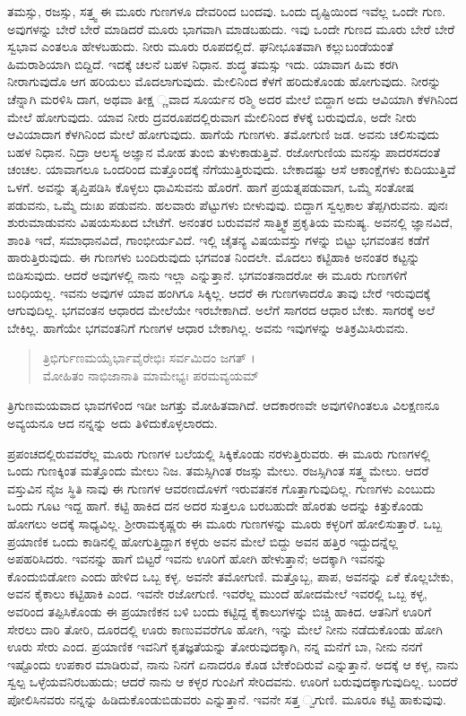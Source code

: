ತಮಸ್ಸು, ರಜಸ್ಸು, ಸತ್ತ್ವ ಈ ಮೂರು ಗುಣಗಳೂ ದೇವರಿಂದ ಬಂದವು. ಒಂದು ದೃಷ್ಟಿಯಿಂದ ಇವೆಲ್ಲ ಒಂದೇ ಗುಣ. ಅವುಗಳನ್ನು ಬೇರೆ ಬೇರೆ ಮಾಡಿದರೆ ಮೂರು ಭಾಗವಾಗಿ ಮಾಡಬಹುದು. ಇವು ಒಂದೇ ಗುಣದ ಮೂರು ಬೇರೆ ಬೇರೆ ಸ್ವಭಾವ ಎಂತಲೂ ಹೇಳಬಹುದು. ನೀರು ಮೂರು ರೂಪದಲ್ಲಿದೆ. ಘನೀಭೂತವಾಗಿ ಕಲ್ಲುಬಂಡೆಯಂತೆ ಹಿಮರಾಶಿಯಾಗಿ ಬಿದ್ದಿದೆ. ಇದಕ್ಕೆ ಚಲನೆ ಬಹಳ ನಿಧಾನ. ಶುದ್ಧ ತಮಸ್ಸು ಇದು. ಯಾವಾಗ ಹಿಮ ಕರಗಿ ನೀರಾಗುವುದೊ ಆಗ ಹರಿಯಲು ಮೊದಲಾಗುವುದು. ಮೇಲಿನಿಂದ ಕೆಳಗೆ ಹರಿದುಕೊಂಡು ಹೋಗುವುದು. ನೀರನ್ನು ಚೆನ್ನಾಗಿ ಮರಳಿಸಿ ದಾಗ, ಅಥವಾ ತೀಕ್ಷ ್ಣವಾದ ಸೂರ್ಯನ ರಶ್ಮಿ ಅದರ ಮೇಲೆ ಬಿದ್ದಾಗ ಅದು ಆವಿಯಾಗಿ ಕೆಳಗಿನಿಂದ ಮೇಲೆ ಹೋಗುವುದು. ಯಾವ ನೀರು ದ್ರವರೂಪದಲ್ಲಿರುವಾಗ ಮೇಲಿನಿಂದ ಕೆಳಕ್ಕೆ ಬರುವುದೊ, ಅದೇ ನೀರು ಆವಿಯಾದಾಗ ಕೆಳಗಿನಿಂದ ಮೇಲೆ ಹೋಗುವುದು. ಹಾಗೆಯೆ ಗುಣಗಳು. ತಮೋಗುಣಿ ಜಡ. ಅವನು ಚಲಿಸುವುದು ಬಹಳ ನಿಧಾನ. ನಿದ್ರಾ ಆಲಸ್ಯ ಅಜ್ಞಾನ ಮೋಹ ತುಂಬಿ ತುಳುಕಾಡುತ್ತಿವೆ. ರಜೋಗುಣಿಯ ಮನಸ್ಸು ಪಾದರಸದಂತೆ ಚಂಚಲ. ಯಾವಾಗಲೂ ಒಂದರಿಂದ ಮತ್ತೊಂದಕ್ಕೆ ನೆಗೆಯುತ್ತಿರುವುದು. ಬೇಕಾದಷ್ಟು ಆಸೆ ಆಕಾಂಕ್ಷೆಗಳು ಕುದಿಯುತ್ತಿವೆ ಒಳಗೆ. ಅವನ್ನು ತೃಪ್ತಿಪಡಿಸಿ ಕೊಳ್ಳಲು ಧಾವಿಸುವನು ಹೊರಗೆ. ಹಾಗೆ ಪ್ರಯತ್ನಪಡುವಾಗ, ಒಮ್ಮೆ ಸಂತೋಷ ಪಡುವನು, ಒಮ್ಮೆ ದುಃಖ ಪಡುವನು. ಹಲವಾರು ಪೆಟ್ಟುಗಳು ಬೀಳುವುವು. ಬಿದ್ದಾಗ ಸ್ವಲ್ಪಕಾಲ ತೆಪ್ಪಗಿರುವನು. ಪುನಃ ಶುರುಮಾಡುವನು ವಿಷಯಸುಖದ ಬೇಟೆಗೆ. ಅನಂತರ ಬರುವವನೆ ಸಾತ್ತ್ವಿಕ ಪ್ರಕೃತಿಯ ಮನುಷ್ಯ. ಅವನಲ್ಲಿ ಜ್ಞಾನವಿದೆ, ಶಾಂತಿ ಇದೆ, ಸಮಾಧಾನವಿದೆ, ಗಾಂಭೀರ್ಯವಿದೆ. ಇಲ್ಲಿ ಚೈತನ್ಯ ವಿಷಯವಸ್ತು ಗಳನ್ನು ಬಿಟ್ಟು ಭಗವಂತನ ಕಡೆಗೆ ಹಾರುತ್ತಿರುವುದು. ಈ ಗುಣಗಳು ಬಂದಿರುವುದು ಭಗವಂತ ನಿಂದಲೇ. ಮೊದಲು ಕಟ್ಟಿಹಾಕಿ ಅನಂತರ ಕಟ್ಟನ್ನು ಬಿಡಿಸುವುದು. ಆದರೆ ಅವುಗಳಲ್ಲಿ ನಾನು ಇಲ್ಲಾ ಎನ್ನುತ್ತಾನೆ. ಭಗವಂತನಾದರೋ ಈ ಮೂರು ಗುಣಗಳಿಗೆ ಬಂಧಿಯಲ್ಲ. ಇವನು ಅವುಗಳ ಯಾವ ಹಂಗಿಗೂ ಸಿಕ್ಕಿಲ್ಲ. ಆದರೆ ಈ ಗುಣಗಳಾದರೊ ತಾವು ಬೇರೆ ಇರುವುದಕ್ಕೆ ಆಗುವುದಿಲ್ಲ. ಭಗವಂತನ ಆಧಾರದ ಮೇಲೆಯೇ ಇರಬೇಕಾಗಿದೆ. ಅಲೆಗೆ ಸಾಗರದ ಆಧಾರ ಬೇಕು. ಸಾಗರಕ್ಕೆ ಅಲೆ ಬೇಕಿಲ್ಲ. ಹಾಗೆಯೇ ಭಗವಂತನಿಗೆ ಗುಣಗಳ ಆಧಾರ ಬೇಕಾಗಿಲ್ಲ. ಅವನು ಇವುಗಳನ್ನು ಅತಿಕ್ರಮಿಸಿರುವನು.

\begin{verse}
 ತ್ರಿಭಿರ್ಗುಣಮಯೈರ್ಭಾವೈರೇಭಿಃ ಸರ್ವಮಿದಂ ಜಗತ್ ।\\ಮೋಹಿತಂ ನಾಭಿಜಾನಾತಿ ಮಾಮೇಭ್ಯಃ ಪರಮವ್ಯಯಮ್ 
\end{verse}

{\small ತ್ರಿಗುಣಮಯವಾದ ಭಾವಗಳಿಂದ ಇಡೀ ಜಗತ್ತು ಮೋಹಿತವಾಗಿದೆ. ಆದಕಾರಣವೇ ಅವುಗಳಿಗಿಂತಲೂ ವಿಲಕ್ಷಣನೂ ಅವ್ಯಯನೂ ಆದ ನನ್ನನ್ನು ಅದು ತಿಳಿದುಕೊಳ್ಳಲಾರದು.}

ಪ್ರಪಂಚದಲ್ಲಿರುವವರೆಲ್ಲ ಮೂರು ಗುಣಗಳ ಬಲೆಯಲ್ಲಿ ಸಿಕ್ಕಿಕೊಂಡು ನರಳುತ್ತಿರುವರು. ಈ ಮೂರು ಗುಣಗಳಲ್ಲಿ ಒಂದು ಗುಣಕ್ಕಿಂತ ಮತ್ತೊಂದು ಮೇಲು ನಿಜ. ತಮಸ್ಸಿಗಿಂತ ರಜಸ್ಸು ಮೇಲು. ರಜಸ್ಸಿಗಿಂತ ಸತ್ತ್ವ ಮೇಲು. ಆದರೆ ವಸ್ತುವಿನ ನೈಜ ಸ್ಥಿತಿ ನಾವು ಈ ಗುಣಗಳ ಆವರಣದೊಳಗೆ ಇರುವತನಕ ಗೊತ್ತಾಗುವುದಿಲ್ಲ. ಗುಣಗಳು ಎಂಬುದು ಒಂದು ಗೂಟ ಇದ್ದ ಹಾಗೆ. ಕಟ್ಟಿ ಹಾಕಿದ ದನ ಅದರ ಸುತ್ತಲೂ ಬರಬಹುದೇ ಹೊರತು ಅದನ್ನು ಕಿತ್ತುಕೊಂಡು ಹೋಗಲು ಅದಕ್ಕೆ ಸಾಧ್ಯವಿಲ್ಲ. ಶ್ರೀರಾಮಕೃಷ್ಣರು ಈ ಮೂರು ಗುಣಗಳನ್ನು ಮೂರು ಕಳ್ಳರಿಗೆ ಹೋಲಿಸುತ್ತಾರೆ. ಒಬ್ಬ ಪ್ರಯಾಣಿಕ ಒಂದು ಕಾಡಿನಲ್ಲಿ ಹೋಗುತ್ತಿದ್ದಾಗ ಕಳ್ಳರು ಅವನ ಮೇಲೆ ಬಿದ್ದು ಅವನ ಹತ್ತಿರ ಇದ್ದುದನ್ನೆಲ್ಲ ಅಪಹರಿಸಿದರು. ಇವನನ್ನು ಹಾಗೆ ಬಿಟ್ಟರೆ ಇವನು ಊರಿಗೆ ಹೋಗಿ ಹೇಳುತ್ತಾನೆ; ಅದಕ್ಕಾಗಿ ಇವನನ್ನು ಕೊಂದುಬಿಡೋಣ ಎಂದು ಹೇಳಿದ ಒಬ್ಬ ಕಳ್ಳ. ಅವನೇ ತಮೋಗುಣಿ. ಮತ್ತೊಬ್ಬ, ಪಾಪ, ಅವನನ್ನು ಏಕೆ ಕೊಲ್ಲಬೇಕು, ಅವನ ಕೈಕಾಲು ಕಟ್ಟಿಹಾಕಿ ಎಂದ. ಇವನೇ ರಜೋಗುಣಿ. ಇವರೆಲ್ಲ ಮುಂದೆ ಹೋದಮೇಲೆ ಇವರಲ್ಲಿ ಒಬ್ಬ ಕಳ್ಳ, ಅವರಿಂದ ತಪ್ಪಿಸಿಕೊಂಡು ಈ ಪ್ರಯಾಣಿಕನ ಬಳಿ ಬಂದು ಕಟ್ಟಿದ್ದ ಕೈಕಾಲುಗಳನ್ನು ಬಿಚ್ಚಿ ಹಾಕಿದ. ಆತನಿಗೆ ಊರಿಗೆ ಸೇರಲು ದಾರಿ ತೋರಿ, ದೂರದಲ್ಲಿ ಊರು ಕಾಣುವವರೆಗೂ ಹೋಗಿ, ಇನ್ನು ಮೇಲೆ ನೀನು ನಡೆದುಕೊಂಡು ಹೋಗಿ ಊರು ಸೇರು ಎಂದ. ಪ್ರಯಾಣಿಕ ಇವನಿಗೆ ಕೃತಜ್ಞತೆಯನ್ನು ತೋರುವುದಕ್ಕಾಗಿ, ನನ್ನ ಮನೆಗೆ ಬಾ, ನೀನು ನನಗೆ ಇಷ್ಟೊಂದು ಉಪಕಾರ ಮಾಡಿರುವೆ, ನಾನು ನಿನಗೆ ಏನಾದರೂ ಕೊಡ ಬೇಕೆಂದಿರುವೆ ಎನ್ನುತ್ತಾನೆ. ಅದಕ್ಕೆ ಆ ಕಳ್ಳ, ನಾನು ಸ್ವಲ್ಪ ಒಳ್ಳೆಯವನಿರಬಹುದು; ಆದರೆ ನಾನು ಆ ಕಳ್ಳರ ಗುಂಪಿಗೆ ಸೇರಿದವನು. ಊರಿಗೆ ಬರುವುದಕ್ಕಾಗುವುದಿಲ್ಲ. ಬಂದರೆ ಪೋಲಿಸಿನವರು ನನ್ನನ್ನು ಹಿಡಿದುಕೊಂಡುಬಿಡುವರು ಎನ್ನುತ್ತಾನೆ. ಇವನೇ ಸತ್ತ ್ವಗುಣಿ. ಮೂರೂ ಕಟ್ಟಿ ಹಾಕುವುವು.

